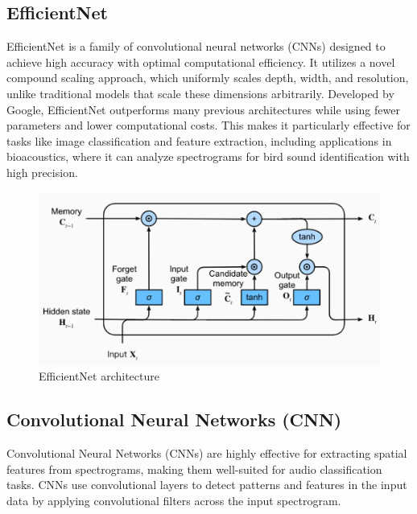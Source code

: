 \subsection{EfficientNet}
EfficientNet is a family of convolutional neural networks (CNNs) designed to achieve high accuracy with optimal computational efficiency. 
It utilizes a novel compound scaling approach, which uniformly scales depth, width, and resolution, unlike traditional models that scale 
these dimensions arbitrarily. Developed by Google, EfficientNet outperforms many previous architectures while using fewer parameters and 
lower computational costs. This makes it particularly effective for tasks like image classification and feature extraction, including applications 
in bioacoustics, where it can analyze spectrograms for bird sound identification with high precision.

\begin{figure}[h!]
    \centering
    \includegraphics[scale=0.4]{images/LSTM.png}
    \caption{EfficientNet architecture}%
\end{figure}



\subsection{Convolutional Neural Networks (CNN)}

Convolutional Neural Networks (CNNs) are highly effective for extracting
spatial features from spectrograms, making them well-suited for audio
classification tasks. CNNs use convolutional layers to detect patterns and
features in the input data by applying convolutional filters across the input
spectrogram.


